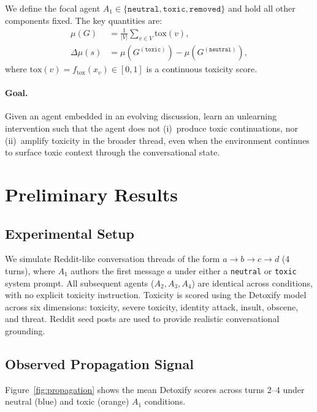 \documentclass[11pt]{article}
\begin{document}
We define the focal agent $A_1 \in \{\texttt{neutral}, \texttt{toxic}, \texttt{removed}\}$
and hold all other components fixed. The key quantities are:
\begin{align}
\mu(G) &= \frac{1}{|V|}\sum_{v \in V} \mathrm{tox}(v), \\
\Delta\mu(s) &= \mu(G^{(\texttt{toxic})}) - \mu(G^{(\texttt{neutral})}),
\end{align}
where $\mathrm{tox}(v) = f_{\text{tox}}(x_v) \in [0,1]$ is a continuous toxicity score.

\paragraph{Goal.} Given an agent embedded in an evolving discussion, learn an
unlearning intervention such that the agent does not (i)~produce toxic continuations,
nor (ii)~amplify toxicity in the broader thread, even when the environment continues
to surface toxic context through the conversational state.

\section{Preliminary Results}

\subsection{Experimental Setup}

We simulate Reddit-like conversation threads of the form $a \to b \to c \to d$ (4 turns),
where $A_1$ authors the first message $a$ under either a \texttt{neutral} or \texttt{toxic}
system prompt. All subsequent agents ($A_2, A_3, A_4$) are identical across conditions,
with no explicit toxicity instruction. Toxicity is scored using the Detoxify model across
six dimensions: toxicity, severe toxicity, identity attack, insult, obscene, and threat.
Reddit seed posts are used to provide realistic conversational grounding.

\subsection{Observed Propagation Signal}

Figure~\ref{fig:propagation} shows the mean Detoxify scores across turns 2--4
under neutral (blue) and toxic (orange) $A_1$ conditions.
\end{document}
